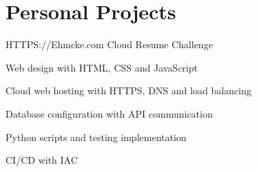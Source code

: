 \section{Personal Projects}
\cventry
{HTTPS://Ehmcke.com} %
{Cloud Resume Challenge} %
{} %
{} %
\begin{cvitems}
\item {Web design with HTML, CSS and JavaScript}
\item {Cloud web hosting with HTTPS, DNS and load balancing}
\item {Database configuration with API communication}
\item {Python scripts and testing implementation}
\item {CI/CD with IAC}
\end{cvitems}